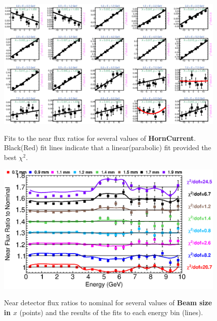 \begin{figure}[ht]
  \begin{center}
    {\includegraphics[width=5.0in]{figures/HornCurrent_near_fits.eps}}
  \end{center}
\caption{ Fits to the near flux ratios for several values of {\bf HornCurrent}. Black(Red) fit lines indicate that a linear(parabolic) fit provided the best $\chi^2$. }
\end{figure}

\begin{figure}[ht]
  \begin{center}
    {\includegraphics[width=6.0in]{figures/BeamSigmaX_near_summary.eps}}
  \end{center}
\caption{ Near detector flux ratios to nominal for several values of {\bf Beam size in $x$} (points) and the results of the fits to each energy bin (lines).}
\end{figure}

